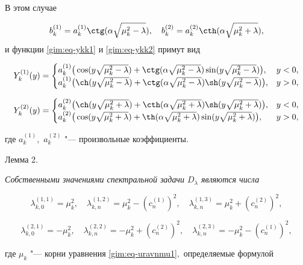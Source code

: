 В этом случае 

$$b_k^{(1)}=a_k^{(1)}\ctg(\alpha\sqrt{\mu_k^2-\lambda}),\quad  

b_k^{(2)}=a_k^{(2)}\cth(\alpha\sqrt{\mu_k^2+\lambda}),$$ и функции \eqref{gim:eq-ykk1} и \eqref{gim:eq-ykk2} примут вид

$$

Y_k^{(1)}(y)= \begin{cases}

a_k^{(1)}\big(\cos(y\sqrt{\mu_k^2-\lambda})+\ctg(\alpha\sqrt{\mu_k^2-\lambda})\sin(y\sqrt{\mu_k^2-\lambda})\big), & y<0,\\

a_k^{(1)}\big(\ch(y\sqrt{\mu_k^2-\lambda})+\ctg(\alpha\sqrt{\mu_k^2-\lambda})\sh(y\sqrt{\mu_k^2-\lambda})\big), & y>0,

\end{cases}$$

$$

Y_k^{(2)}(y)= \begin{cases}

a_k^{(2)}\big(\ch(y\sqrt{\mu_k^2+\lambda})+\cth(\alpha\sqrt{\mu_k^2+\lambda})\sh(y\sqrt{\mu_k^2+\lambda})\big), &y<0,\\

a_k^{(2)}\big(\cos(y\sqrt{\mu_k^2+\lambda})+\th(\alpha\sqrt{\mu_k^2+\lambda})\sin(y\sqrt{\mu_k^2+\lambda})\big),& y>0,

\end{cases}$$

где $a_k^{(1)},$ $a_k^{(2)}$  "--- произвольные коэффициенты.



\vskip2mm



\hypertarget{gim:l2}{}



{\small \sc Лемма 2.} {\it Собственными значениями спектральной задачи $ D_\lambda$ являются числа

$$

\lambda_{k, 0}^{(1,1)}=\mu_k^2, \quad 

\lambda_{k, n}^{(1,2)}=\mu_k^2- (c_n^{(1)})^2,\quad 

\lambda_{k, n}^{(1,3)}=\mu_k^2+ (c_n^{(2)} )^2,$$

$$

\lambda_{k, 0}^{(2,1)}=-\mu_k^2,\quad 

\lambda_{k, n}^{(2,2)}=-\mu_k^2+ (c_n^{(2)} )^2,\quad 

\lambda_{k, n}^{(2,3)}=-\mu_k^2- (c_n^{(1)} )^2,$$

где $\mu_k$ "--- корни уравнения \eqref{gim:eq-uravnmu1}$,$ определяемые формулой} 

